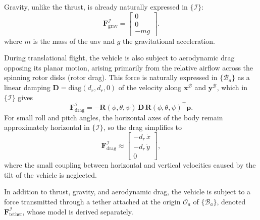 Gravity, unlike the thrust, is already naturally expressed in $\{\mathcal{I}\}$:
\begin{equation}
    \mathbf{F}_{\mathrm{grav}}^{\mathcal{I}} = \begin{bmatrix} 0 \\ 0 \\ -mg \end{bmatrix}.
    \label{eq:uav_gravity}
\end{equation}
where $m$ is the mass of the \gls{uav} and $g$ the gravitational acceleration.

During translational flight, the vehicle is also subject to aerodynamic drag opposing its planar motion, arising primarily from the relative airflow across the spinning rotor disks (rotor drag). This force is naturally expressed in $\{\mathcal{B}_a\}$ as a linear damping $\mathbf{D} = \mathrm{diag}(d_r, d_r, 0)$ of the velocity along $\mathbf{x}^{\mathcal{B}}$ and $\mathbf{y}^{\mathcal{B}}$, which in $\{\mathcal{I}\}$ gives
\begin{equation}
    \mathbf{F}_{\mathrm{drag}}^{\mathcal{I}} = -\mathbf{R}(\phi,\theta,\psi)\,\mathbf{D}\,\mathbf{R}(\phi,\theta,\psi)^\top\dot{\mathbf{p}}.
    \label{eq:uav_drag_body}
\end{equation}
For small roll and pitch angles, the horizontal axes of the body remain approximately horizontal in $\{\mathcal{I}\}$, so the drag simplifies to
\begin{equation}
    \mathbf{F}_{\mathrm{drag}}^{\mathcal{I}} \approx \begin{bmatrix} -d_r\,\dot{x} \\ -d_r\,\dot{y} \\ 0 \end{bmatrix},
    \label{eq:uav_drag}
\end{equation}
where the small coupling between horizontal and vertical velocities caused by the tilt of the vehicle is neglected.

In addition to thrust, gravity, and aerodynamic drag, the vehicle is subject to a force transmitted through a tether attached at the origin $\mathcal{O}_a$ of $\{\mathcal{B}_a\}$, denoted $\mathbf{F}_{\mathrm{tether}}^{\mathcal{I}}$, whose model is derived separately.

